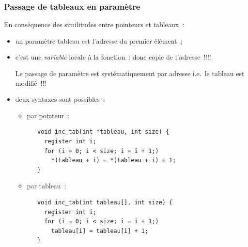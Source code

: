 \begin{frame}[fragile]
    \frametitle{Passage de tableaux en param\`etre}
En cons\'equence des similitudes entre pointeurs et tableaux~: 
\begin{itemize}
  \item un param\`etre tableau est l'adresse du premier \'el\'ement~;
  \item c'est une {\em variable} locale \`a la fonction~: donc copie de 
    l'adresse~!!!! 
    \par
    \begin{bf}
      Le passage de param\`etre est syst\'ematiquement par adresse
      i.e.\ le tableau est modifi\'e~!!!
    \end{bf}
  \item deux syntaxes sont possibles~:
\begin{itemize}
\item par pointeur~:
{\normalsize
\begin{verbatim}
   void inc_tab(int *tableau, int size) {
     register int i;
     for (i = 0; i < size; i = i + 1;) 
       *(tableau + i) = *(tableau + i) + 1;
   }
\end{verbatim}
}
\item par tableau~:
{\normalsize
\begin{verbatim}
   void inc_tab(int tableau[], int size) {
     register int i;
     for (i = 0; i < size; i = i + 1;) 
       tableau[i] = tableau[i] + 1;
   }
\end{verbatim}
}
\end{itemize}
\end{itemize}


\end{frame}
